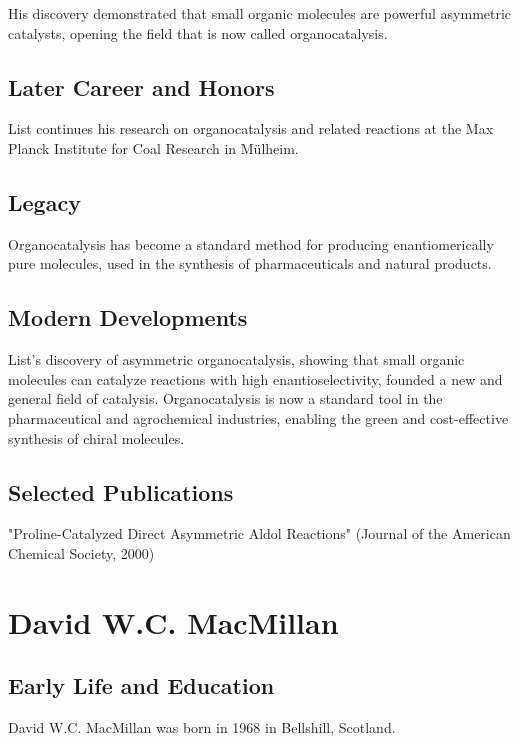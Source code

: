 His discovery demonstrated that small organic molecules are powerful asymmetric catalysts, opening the field that is now called organocatalysis.

\subsection*{Later Career and Honors}

List continues his research on organocatalysis and related reactions at the Max Planck Institute for Coal Research in Mülheim.

\subsection*{Legacy}

Organocatalysis has become a standard method for producing enantiomerically pure molecules, used in the synthesis of pharmaceuticals and natural products.

\subsection*{Modern Developments}

List's discovery of asymmetric organocatalysis, showing that small organic molecules can catalyze reactions with high enantioselectivity, founded a new and general field of catalysis. Organocatalysis is now a standard tool in the pharmaceutical and agrochemical industries, enabling the green and cost-effective synthesis of chiral molecules.

\subsection*{Selected Publications}

"Proline-Catalyzed Direct Asymmetric Aldol Reactions" (Journal of the American Chemical Society, 2000)

\clearpage

\section{David W.C. MacMillan}

\subsection*{Early Life and Education}

David W.C. MacMillan was born in 1968 in Bellshill, Scotland.

